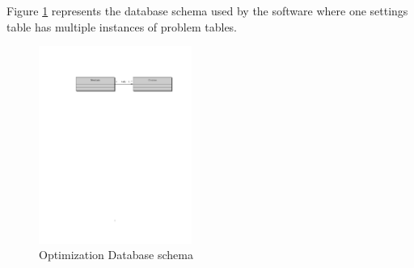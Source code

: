 Figure \ref{fig:database schema} represents the database schema used by the software where one settings table has multiple instances of problem tables. 


\begin{figure}[!h]
    \centering
    \includegraphics[width=5cm]{chapters/chapter_3_Software/database_schema.pdf}
    \caption{Optimization Database schema}
    \label{fig:database schema}
\end{figure}




